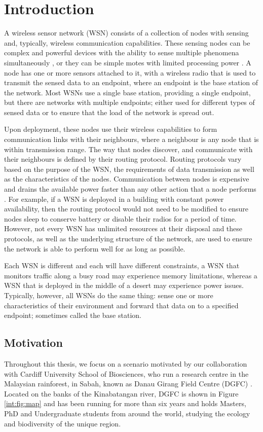 \chapter{Introduction}
A wireless sensor network (WSN) consists of a collection of nodes with sensing and, typically, wireless communication capabilities. These sensing nodes can be complex and powerful devices with the ability to sense multiple phenomena simultaneously \cite{Maurer, Nachman2008, Sarajevo2014}, or they can be simple motes with limited processing power \cite{Kays2009, Martinez2004, Szewczyk2004b}. A node has one or more sensors attached to it, with a wireless radio that is used to transmit the sensed data to an endpoint, where an endpoint is the base station of the network. Most WSNs use a single base station, providing a single endpoint, but there are networks with multiple endpoints; either used for different types of sensed data or to ensure that the load of the network is spread out.

Upon deployment, these nodes use their wireless capabilities to form communication links with their neighbours, where a neighbour is any node that is within transmission range. The way that nodes discover, and communicate with their neighbours is defined by their routing protocol. Routing protocols vary based on the purpose of the WSN, the requirements of data transmission as well as the characteristics of the nodes. Communication between nodes is expensive and drains the available power faster than any other action that a node performs \cite{Raghunathan2002}. For example, if a WSN is deployed in a building with constant power availability, then the routing protocol would not need to be modified to ensure nodes sleep to conserve battery or disable their radios for a period of time. However, not every WSN has unlimited resources at their disposal and these protocols, as well as the underlying structure of the network, are used to ensure the network is able to perform well for as long as possible.

Each WSN is different and each will have different constraints, a WSN that monitors traffic along a busy road may experience memory limitations, whereas a  WSN that is deployed in the middle of a desert may experience power issues. Typically, however, all WSNs do the same thing: sense one or more characteristics of their environment and forward that data on to a specified endpoint; sometimes called the base station.

\section{Motivation}\label{int:mot}
Throughout this thesis, we focus on a scenario motivated by our collaboration with Cardiff University School of Biosciences, who run a research centre in the Malaysian rainforest, in Sabah, known as Danau Girang Field Centre (DGFC)  \cite{dgfc}. Located on the banks of the Kinabatangan river, DGFC is shown in Figure \ref{int:fig:map} and has been running for more than six years and holds Masters, PhD and Undergraduate students from around the world, studying the ecology and biodiversity of the unique region.

